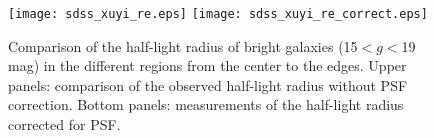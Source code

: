 \documentclass[twocolumn,trackchanges]{aastex61}
\begin{document}
\begin{figure}[htb!]
 \setcounter{figure}{2} \renewcommand{\thefigure}{A.\arabic{figure}} 

 \begin{center}
   \setlength{\abovecaptionskip}{-5pt}

  \texttt{[image: sdss\_xuyi\_re.eps]}
   \texttt{[image: sdss\_xuyi\_re\_correct.eps]}

  \caption{Comparison of the half-light radius of bright galaxies (15$< g <$19\,mag) in the different regions from the center to the edges. Upper panels: comparison of the observed half-light radius without PSF correction. Bottom panels: measurements of the half-light radius corrected for PSF.}
  \label{fig:figA3}
 \end{center}
\end{figure}
\end{document}
